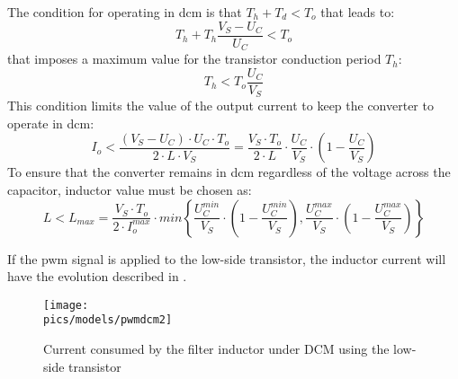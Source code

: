 The condition for operating in \gls{dcm} is that $T_h + T_d < T_o$ that leads to:
\begin{equation}
    T_h + T_h \frac{V_S - U_C}{U_C} < T_o
\end{equation}
that imposes a maximum value for the transistor conduction period $T_h$:
\begin{equation}
    T_h < T_o \frac{U_C}{V_S}
\end{equation}
This condition limits the value of the output current to keep the converter to operate in \gls{dcm}:
\begin{equation}
    I_o < \frac{(V_S - U_C) \cdot U_C \cdot T_o}{2 \cdot L \cdot V_S} = \frac{V_S \cdot T_o}{2 \cdot L} \cdot \frac{U_C}{V_S} \cdot \left(1 - \frac{U_C}{V_S}\right)
\end{equation}
To ensure that the converter remains in \gls{dcm} regardless of the voltage across the capacitor, inductor value must be chosen as:
\begin{equation}
    L < L_{max} = \frac{V_S \cdot T_o}{2 \cdot I_o^{max}} \cdot min\left\{\frac{U_C^{min}}{V_S} \cdot \left(1 - \frac{U_C^{min}}{V_S}\right), \frac{U_C^{max}}{V_S} \cdot \left(1 - \frac{U_C^{max}}{V_S}\right)\right\}
\end{equation}

If the \gls{pwm} signal is applied to the low-side transistor, the inductor current will have the evolution described in .

\begin{figure}[!ht]
    \begin{center}\texttt{[image: \\pics/models/pwmdcm2]}\end{center}
    \caption{Current consumed by the filter inductor under DCM using the low-side transistor}
    \label{fig:pwmdcm2}
\end{figure}

